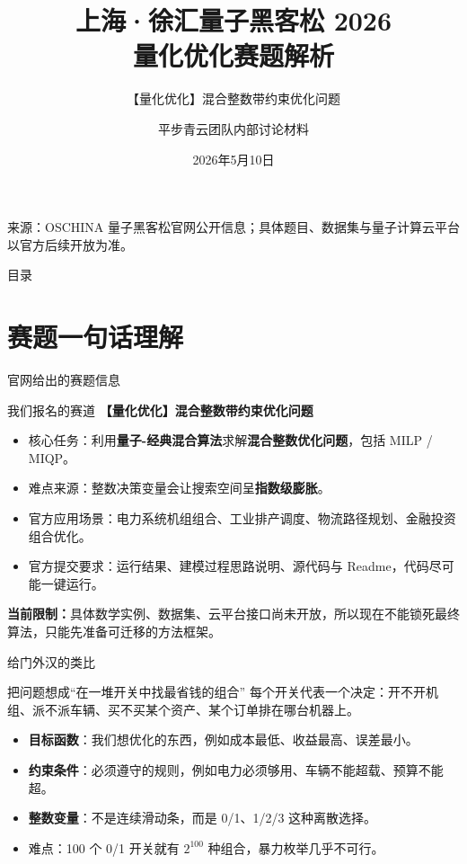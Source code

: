 \documentclass[aspectratio=169]{beamer}
\title[量化优化赛题解析]{上海·徐汇量子黑客松 2026\\量化优化赛题解析}
\subtitle{【量化优化】混合整数带约束优化问题}
\author{平步青云团队内部讨论材料}
\date{2026年5月10日}
\newcommand{\term}[1]{\textcolor{QuantumBlue}{\textbf{#1}}}
\newcommand{\warning}[1]{\textcolor{QuantumGold}{\textbf{#1}}}
\begin{document}
\begin{frame}
  \titlepage
  \vspace{-0.5em}
  \begin{center}
    \footnotesize 来源：OSCHINA 量子黑客松官网公开信息；具体题目、数据集与量子计算云平台以官方后续开放为准。
  \end{center}
\end{frame}

\begin{frame}{目录}
  \tableofcontents
\end{frame}

\section{赛题一句话理解}

\begin{frame}{官网给出的赛题信息}
\small
\begin{block}{我们报名的赛道}
  \term{【量化优化】混合整数带约束优化问题}
\end{block}

\begin{itemize}
  \item 核心任务：利用\term{量子-经典混合算法}求解\term{混合整数优化问题}，包括 MILP / MIQP。
  \item 难点来源：整数决策变量会让搜索空间呈\term{指数级膨胀}。
  \item 官方应用场景：电力系统机组组合、工业排产调度、物流路径规划、金融投资组合优化。
  \item 官方提交要求：运行结果、建模过程思路说明、源代码与 Readme，代码尽可能一键运行。
\end{itemize}

\vspace{0.4em}
\warning{当前限制：}具体数学实例、数据集、云平台接口尚未开放，所以现在不能锁死最终算法，只能先准备可迁移的方法框架。
\end{frame}

\begin{frame}{给门外汉的类比}
\small
\begin{block}{把问题想成“在一堆开关中找最省钱的组合”}
  每个开关代表一个决定：开不开机组、派不派车辆、买不买某个资产、某个订单排在哪台机器上。
\end{block}

\begin{itemize}
  \item \term{目标函数}：我们想优化的东西，例如成本最低、收益最高、误差最小。
  \item \term{约束条件}：必须遵守的规则，例如电力必须够用、车辆不能超载、预算不能超。
  \item \term{整数变量}：不是连续滑动条，而是 0/1、1/2/3 这种离散选择。
  \item 难点：100 个 0/1 开关就有 $2^{100}$ 种组合，暴力枚举几乎不可行。
\end{itemize}
\end{frame}
\end{document}
